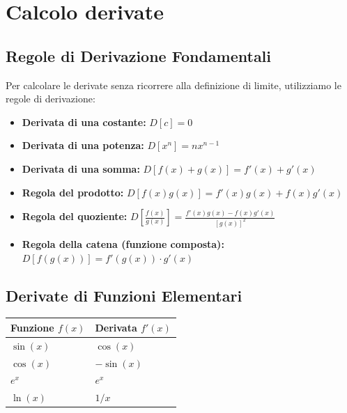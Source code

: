 \chapter{Calcolo derivate}
\section{Regole di Derivazione Fondamentali}
Per calcolare le derivate senza ricorrere alla definizione di limite, utilizziamo le regole di derivazione:

\begin{itemize}
    \item \textbf{Derivata di una costante:} $D[c] = 0$
    \item \textbf{Derivata di una potenza:} $D[x^n] = n x^{n-1}$
    \item \textbf{Derivata di una somma:} $D[f(x) + g(x)] = f'(x) + g'(x)$
    \item \textbf{Regola del prodotto:} $D[f(x)g(x)] = f'(x)g(x) + f(x)g'(x)$
    \item \textbf{Regola del quoziente:} $D\left[\frac{f(x)}{g(x)}\right] = \frac{f'(x)g(x) - f(x)g'(x)}{[g(x)]^2}$
    \item \textbf{Regola della catena (funzione composta):} $D[f(g(x))] = f'(g(x)) \cdot g'(x)$
\end{itemize}

\section{Derivate di Funzioni Elementari}
\begin{table}[h!]
\centering
\begin{tabular}{|l|l|}
\hline
\textbf{Funzione $f(x)$} & \textbf{Derivata $f'(x)$} \\ \hline
$\sin(x)$ & $\cos(x)$ \\ \hline
$\cos(x)$ & $-\sin(x)$ \\ \hline
$e^x$ & $e^x$ \\ \hline
$\ln(x)$ & $1/x$ \\ \hline
\end{tabular}
\end{table}

